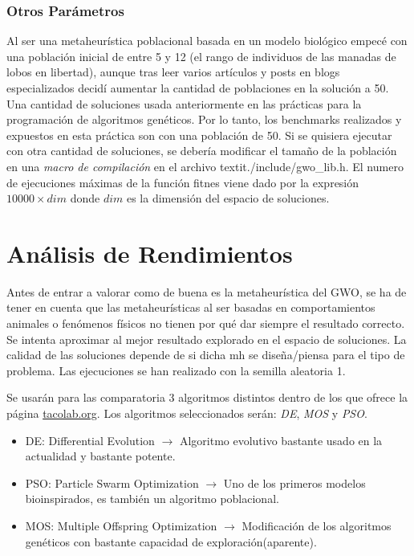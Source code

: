 \documentclass[a4paper]{report}
\begin{document}
\subsubsection*{Otros Parámetros}
Al ser una metaheurística poblacional basada en un modelo biológico empecé con una población inicial de entre 5 y 12 (el rango de individuos de las manadas de lobos en libertad), aunque tras leer varios artículos y posts en blogs especializados decidí aumentar la cantidad de poblaciones en la solución a 50. Una cantidad de soluciones usada anteriormente en las prácticas para la programación de algoritmos genéticos. Por lo tanto, los benchmarks realizados y expuestos en esta práctica son con una población de 50. Si se quisiera ejecutar con otra cantidad de soluciones, se debería modificar el tamaño de la población en una \textit{macro de compilación} en el archivo textit{./include/gwo\_lib.h}. El numero de ejecuciones máximas de la función fitnes viene dado por la expresión $10000 \times dim$ donde $dim$ es la dimensión del espacio de soluciones.






\section{Análisis de Rendimientos}

Antes de entrar a valorar como de buena es la metaheurística del GWO, se ha de tener en cuenta que las metaheurísticas al ser basadas en comportamientos animales o fenómenos físicos no tienen por qué dar siempre el resultado correcto.
Se intenta aproximar al mejor resultado explorado en el espacio de soluciones. La calidad de las soluciones depende de si dicha mh se diseña/piensa para el tipo de problema. Las ejecuciones se han realizado con la semilla aleatoria 1.

Se usarán para las comparatoria 3 algoritmos distintos dentro de los que ofrece la página \url{tacolab.org}. Los algoritmos seleccionados serán: \textit{DE}, \textit{MOS} y \textit{PSO}.
\begin{itemize}
    \item DE: Differential Evolution $\rightarrow$ Algoritmo evolutivo bastante usado en la actualidad y bastante potente.
    \item PSO: Particle Swarm Optimization $\rightarrow$ Uno de los primeros modelos bioinspirados, es también un algoritmo poblacional.
    \item MOS: Multiple Offspring Optimization $\rightarrow$ Modificación de los algoritmos genéticos con bastante capacidad de exploración(aparente).
\end{itemize}
\end{document}

